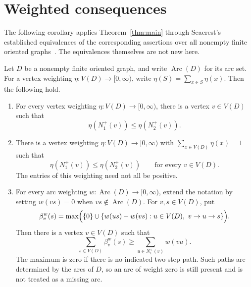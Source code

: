 \section{Weighted consequences}\label{sec:weighted-consequences}

The following corollary applies Theorem~\ref{thm:main} through Seacrest's
established equivalences of the corresponding assertions over all nonempty
finite oriented graphs~\cite{Seacrest2015}.  The equivalences themselves are
not new here.

\begin{corollary}\label{cor:weighted-forms}
Let \(D\) be a nonempty finite oriented graph, and write \(\operatorname{Arc}(D)\) for its
arc set.  For a vertex weighting \(\eta:V(D)\to[0,\infty)\), write
\(\eta(S)=\sum_{x\in S}\eta(x)\).  Then the following hold.
\begin{enumerate}[label=\textup{(\roman*)}]
\item For every vertex weighting \(\eta:V(D)\to[0,\infty)\), there is a
vertex \(v\in V(D)\) such that
\[
 \eta(N_1^+(v))\leq\eta(N_2^+(v)).
\]

\item There is a vertex weighting \(\eta:V(D)\to[0,\infty)\) with
\(\sum_{x\in V(D)}\eta(x)=1\) such that
\[
 \eta(N_1^+(v))\leq\eta(N_2^+(v))\qquad\text{for every }v\in V(D).
\]
The entries of this weighting need not all be positive.

\item For every arc weighting \(w:\operatorname{Arc}(D)\to[0,\infty)\), extend the notation
by setting \(w(vs)=0\) when \(vs\notin \operatorname{Arc}(D)\).  For \(v,s\in V(D)\), put
\[
 \beta_v^w(s)=\max\Bigl(\{0\}\cup
 \{w(us)-w(vs):u\in V(D),\ v\to u\to s\}\Bigr).
\]
Then there is a vertex \(v\in V(D)\) such that
\[
 \sum_{s\in V(D)}\beta_v^w(s)
 \geq \sum_{u\in N_1^+(v)}w(vu).
\]
The maximum is zero if there is no indicated two-step path.  Such paths
are determined by the arcs of \(D\), so an arc of weight zero is still
present and is not treated as a missing arc.
\end{enumerate}
\end{corollary}

